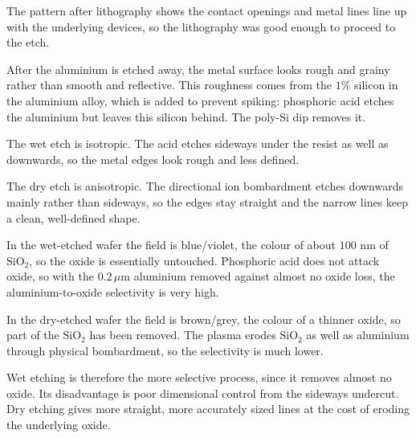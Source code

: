 The pattern after lithography shows the contact openings and metal lines line up with the underlying devices, so the lithography was good enough to proceed to the etch.

After the aluminium is etched away, the metal surface looks rough and grainy rather than smooth and reflective. This roughness comes from the $1\%$ silicon in the aluminium alloy, which is added to prevent spiking: phosphoric acid etches the aluminium but leaves this silicon behind. The poly-Si dip removes it.

The wet etch is isotropic. The acid etches sideways under the resist as well as downwards, so the metal edges look rough and less defined.

The dry etch is anisotropic. The directional ion bombardment etches downwards mainly rather than sideways, so the edges stay straight and the narrow lines keep a clean, well-defined shape.

In the wet-etched wafer the field is blue/violet, the colour of about $100$ nm of $\mathrm{SiO_2}$, so the oxide is essentially untouched. Phosphoric acid does not attack oxide, so with the $0.2\,\mu$m aluminium removed against almost no oxide loss, the aluminium-to-oxide selectivity is very high.

In the dry-etched wafer the field is brown/grey, the colour of a thinner oxide, so part of the $\mathrm{SiO_2}$ has been removed. The plasma erodes $\mathrm{SiO_2}$ as well as aluminium through physical bombardment, so the selectivity is much lower.

Wet etching is therefore the more selective process, since it removes almost no oxide. Its disadvantage is poor dimensional control from the sideways undercut. Dry etching gives more straight, more accurately sized lines at the cost of eroding the underlying oxide.